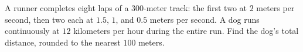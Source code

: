 A runner completes eight laps of a $300$-meter track: the first two at $2$ meters per second, then two each at $1.5$, $1$, and $0.5$ meters per second. A dog runs continuously at $12$ kilometers per hour during the entire run. Find the dog's total distance, rounded to the nearest $100$ meters.
